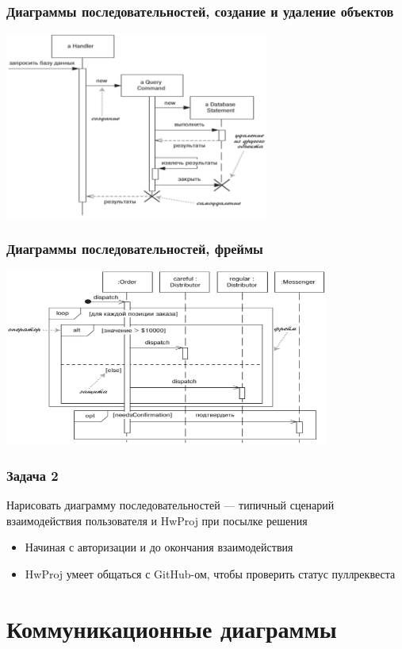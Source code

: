\documentclass[xetex,mathserif,serif]{beamer}
\begin{document}
	\begin{frame}
		\frametitle{Диаграммы последовательностей, создание и удаление объектов}
		\begin{center}
			\includegraphics[width=0.65\textwidth]{sequenceLifeCycle.png}
		\end{center}
	\end{frame}

	\begin{frame}
		\frametitle{Диаграммы последовательностей, фреймы}
		\begin{center}
			\includegraphics[width=0.8\textwidth]{sequenceFrames.png}
		\end{center}
	\end{frame}

	\begin{frame}
		\frametitle{Задача 2}
		Нарисовать диаграмму последовательностей --- типичный сценарий взаимодействия пользователя и HwProj при посылке решения
		\begin{itemize}
			\item Начиная с авторизации и до окончания взаимодействия
			\item HwProj умеет общаться с GitHub-ом, чтобы проверить статус пуллреквеста
		\end{itemize}
	\end{frame}

	\section{Коммуникационные диаграммы}
\end{document}
